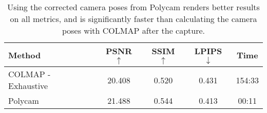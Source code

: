 \begin{table}[h]
\centering
\begin{tabular}{lcccc}
\hline
Method  & PSNR $\uparrow$ & SSIM $\uparrow$ & LPIPS $\downarrow$& Time  \\ \hline
COLMAP - Exhaustive         & 20.408    & 0.520    &  0.431     & 154:33     \\
Polycam                     & 21.488    & 0.544    & 0.413      & 00:11 \\
\hline
\end{tabular}
\caption{Using the corrected camera poses from Polycam renders better results on all metrics, and is significantly faster than calculating the camera poses with COLMAP after the capture.}
\label{tab:colmap-polycam-comparison}
\end{table}